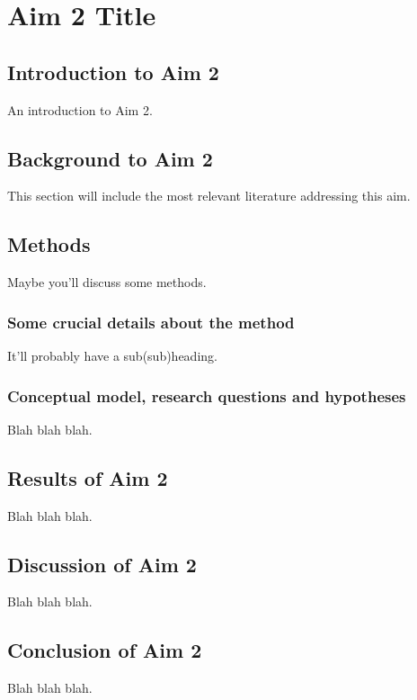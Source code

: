 \center

\section{Aim 2 Title}

\raggedright

\subsection{Introduction to Aim 2}
An introduction to Aim 2.

\subsection{Background to Aim 2}
This section will include the most relevant literature addressing this
aim. 

\subsection{Methods}
Maybe you'll discuss some methods.

\subsubsection{Some crucial details about the method}
It'll probably have a sub(sub)heading.

\subsubsection{Conceptual model, research questions and hypotheses}
Blah blah blah.

\subsection{Results of Aim 2}
Blah blah blah.

\subsection{Discussion of Aim 2}
Blah blah blah.

\subsection{Conclusion of Aim 2}
Blah blah blah.